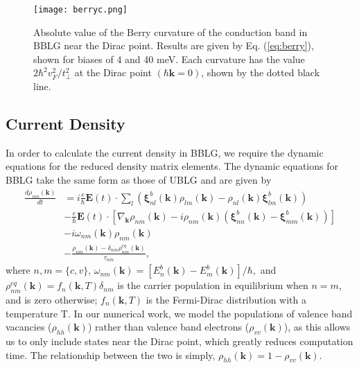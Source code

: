 \documentclass[twocolumn,secnumarabic,amssymb, nobibnotes, aps, prd, superscriptaddress]{revtex4-1}
\begin{document}
\begin{figure}[h]
\centering
\texttt{[image: berryc.png]}
\caption{Absolute value of the Berry curvature of the conduction band in BBLG near the Dirac point. Results are given by Eq. (\ref{eq:berry}), shown for biases of 4 and 40 meV. Each curvature has the value $2\hbar^{2}v_{F}^{2}/t_{\perp}^{2}$
  at the Dirac point $(\hbar\mathbf{k}=0)$, shown by the dotted black line.\label{fig:Berry}}
\end{figure}
\subsection{Current Density}
 In order to calculate the current density in BBLG, we require the dynamic equations for the reduced density matrix elements. The dynamic equations for BBLG take the same form as those of UBLG \cite{mcgouran2016nonlinear} and are given by 
\begin{equation}
\begin{alignedat}{1}\frac{d\rho_{nm}(\mathbf{k})}{dt} & =i\frac{e}{\hbar}\mathbf{E}(t)\cdot\sum_{l}(\mathbf{\xi}_{nl}^{b}(\mathbf{k})\rho_{lm}(\mathbf{k})-\rho_{nl}(\mathbf{k})\mathbf{\xi}_{lm}^{b}(\mathbf{k}))\\
 & -\frac{e}{\hbar}\mathbf{E}(t)\cdot\left[\nabla_{\mathbf{k}}\rho_{nm}(\mathbf{k})-i\rho_{nm}(\mathbf{k})(\mathbf{\xi}_{nn}^{b}(\mathbf{k})-\mathbf{\xi}_{mm}^{b}(\mathbf{k}))\right]\\
 & -i\omega_{nm}(\mathbf{k})\rho_{nm}(\mathbf{k})\\
 & -\frac{\rho_{nm}\left(\mathbf{k}\right)-\delta_{nm}\rho_{nm}^{eq}(\mathbf{k})}{\tau_{nm}},
\end{alignedat}
\end{equation} 
where $n,m=\{c,v\}$, $ \omega_{nm}(\mathbf{k})=[E_{n}^{b}(\mathbf{k})-E_{m}^{b}(\mathbf{k})]/\hbar,$ and $\rho_{nm}^{eq}(\mathbf{k})=f_{n}(\mathbf{k},T)\delta_{nm}$ is the carrier population in equilibrium when $n=m$, and is zero otherwise; $f_{n}(\mathbf{k},T)$ is the Fermi-Dirac distribution with a temperature T. In our numerical work, we model the populations of valence band vacancies ($\rho_{hh}(\mathbf{k})$) rather than valence band electrons ($\rho_{vv}(\mathbf{k})$), as this allows us to only include states near the Dirac point, which greatly reduces computation time. The relationship between the two is simply, $\rho_{hh}(\mathbf{k})=1-\rho_{vv}(\mathbf{k})$.
\end{document}
